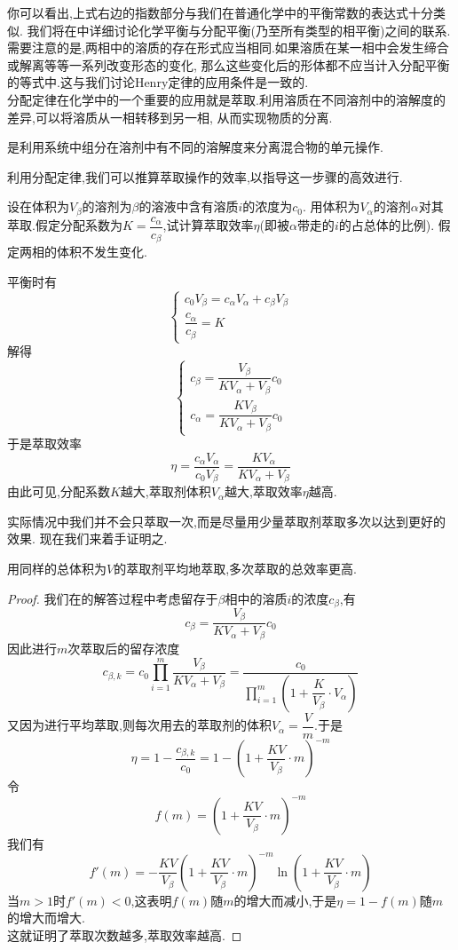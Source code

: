 \documentclass{ctexart}
\begin{document}
你可以看出,上式右边的指数部分与我们在普通化学中的平衡常数的表达式十分类似.%
我们将在中详细讨论化学平衡与分配平衡(乃至所有类型的相平衡)之间的联系.\\
\indent 需要注意的是,两相中的溶质的存在形式应当相同.如果溶质在某一相中会发生缔合或解离等等一系列改变形态的变化,%
那么这些变化后的形体都不应当计入分配平衡的等式中.这与我们讨论Henry定律的应用条件是一致的.\\
\indent 分配定律在化学中的一个重要的应用就是萃取.利用溶质在不同溶剂中的溶解度的差异,可以将溶质从一相转移到另一相,%
从而实现物质的分离.
\begin{definition}[4C.5.2 萃取]
    是利用系统中组分在溶剂中有不同的溶解度来分离混合物的单元操作.
\end{definition}
利用分配定律,我们可以推算萃取操作的效率,以指导这一步骤的高效进行.
\begin{problem}[4C.5.3]
    设在体积为$V_\beta$的溶剂为$\beta$的溶液中含有溶质$i$的浓度为$c_{0}$.%
    用体积为$V_\alpha$的溶剂$\alpha$对其萃取.假定分配系数为$K=\dfrac{c_{\alpha}}{c_{\beta}}$,试计算萃取效率$\eta$(即被$\alpha$带走的$i$的占总体的比例).%
    假定两相的体积不发生变化.
\end{problem}
\begin{solution}
    平衡时有
    \[\left\{\begin{array}{l}
        c_0V_\beta=c_{\alpha}V_{\alpha}+c_{\beta}V_{\beta} \\
        \dfrac{c_\alpha}{c_\beta}=K
    \end{array}\right.\]
    解得
    \[\left\{\begin{array}{l}
        c_\beta=\dfrac{V_\beta}{KV_\alpha+V_\beta}c_0 \\
        c_\alpha=\dfrac{KV_\beta}{KV_\alpha+V_\beta}c_0
    \end{array}\right.\]
    于是萃取效率
    \[\eta=\dfrac{c_\alpha V_\alpha}{c_0V_\beta}=\dfrac{KV_\alpha}{KV_\alpha+V_\beta}\]
    由此可见,分配系数$K$越大,萃取剂体积$V_\alpha$越大,萃取效率$\eta$越高.
\end{solution}
实际情况中我们并不会只萃取一次,而是尽量用少量萃取剂萃取多次以达到更好的效果.%
现在我们来着手证明之.
\begin{theorem}[4C.5.4 多次萃取]
    用同样的总体积为$V$的萃取剂平均地萃取,多次萃取的总效率更高.
\end{theorem}
\begin{proof}
    我们在的解答过程中考虑留存于$\beta$相中的溶质$i$的浓度$c_\beta$,有
    \[c_\beta=\dfrac{V_{\beta}}{KV_\alpha+V_\beta}c_0\]
    因此进行$m$次萃取后的留存浓度
    \[c_{\beta,k}=c_0\prod_{i=1}^{m}\dfrac{V_\beta}{KV_\alpha+V_\beta}
    =\dfrac{c_0}{\displaystyle\prod_{i=1}^m\left(1+\dfrac{K}{V_\beta}\cdot V_\alpha\right)}\]
    又因为进行平均萃取,则每次用去的萃取剂的体积$V_{\alpha}=\dfrac{V}{m}$.于是
    \[\eta=1-\dfrac{c_{\beta,k}}{c_0}=1-\left(1+\dfrac{KV}{V_\beta}\cdot m\right)^{-m}\]
    令
    \[f(m)=\left(1+\dfrac{KV}{V_\beta}\cdot m\right)^{-m}\]
    我们有
    \[f'(m)=-\dfrac{KV}{V_\beta}\left(1+\dfrac{KV}{V_\beta}\cdot m\right)^{-m}\ln\left(1+\dfrac{KV}{V_\beta}\cdot m\right)\]
    当$m>1$时$f'(m)<0$,这表明$f(m)$随$m$的增大而减小,于是$\eta=1-f(m)$随$m$的增大而增大.\\
    这就证明了萃取次数越多,萃取效率越高.
\end{proof}
\end{document}
